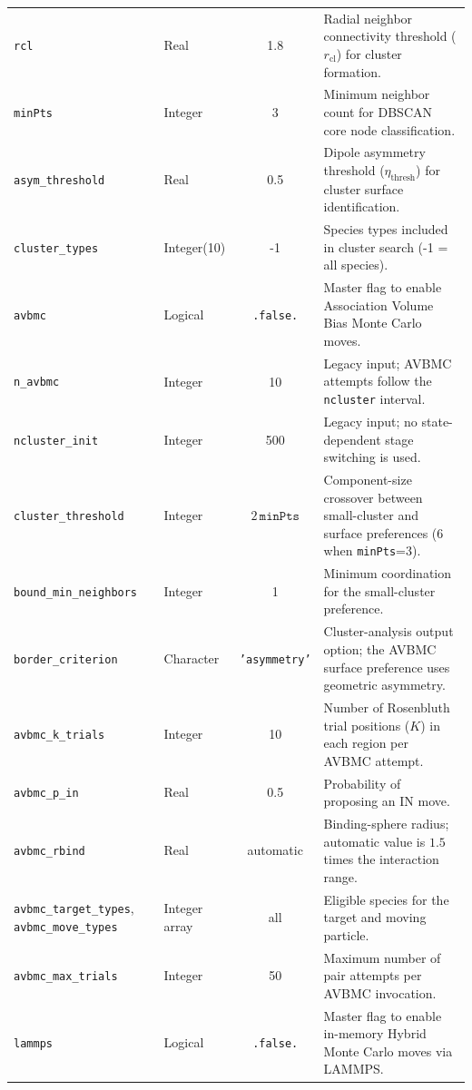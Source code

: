 \documentclass[final,5p,times,twocolumn]{elsarticle}
\begin{document}
\begin{table}[tbp]
\begin{tabularx}{\textwidth}{l l c X}
\texttt{rcl} & Real & 1.8 & Radial neighbor connectivity threshold ($r_{\text{cl}}$) for cluster formation. \\
\texttt{minPts} & Integer & 3 & Minimum neighbor count for DBSCAN core node classification. \\
\texttt{asym\_threshold}& Real & 0.5 & Dipole asymmetry threshold ($\eta_{\text{thresh}}$) for cluster surface identification. \\
\texttt{cluster\_types}& Integer(10) & -1 & Species types included in cluster search (-1 = all species). \\
\texttt{avbmc} & Logical & \texttt{.false.} & Master flag to enable Association Volume Bias Monte Carlo moves. \\
\texttt{n\_avbmc} & Integer & 10 & Legacy input; AVBMC attempts follow the \texttt{ncluster} interval. \\
\texttt{ncluster\_init} & Integer & 500 & Legacy input; no state-dependent stage switching is used. \\
\texttt{cluster\_threshold}& Integer & $2\,\texttt{minPts}$ & Component-size crossover between small-cluster and surface preferences (6 when \texttt{minPts}=3). \\
\texttt{bound\_min\_neighbors}& Integer & 1 & Minimum coordination for the small-cluster preference. \\
\texttt{border\_criterion}& Character & \texttt{'asymmetry'}& Cluster-analysis output option; the AVBMC surface preference uses geometric asymmetry. \\
\texttt{avbmc\_k\_trials}& Integer & 10 & Number of Rosenbluth trial positions ($K$) in each region per AVBMC attempt. \\
\texttt{avbmc\_p\_in}& Real & 0.5 & Probability of proposing an IN move. \\
\texttt{avbmc\_rbind}& Real & automatic & Binding-sphere radius; automatic value is $1.5$ times the interaction range. \\
\texttt{avbmc\_target\_types}, \texttt{avbmc\_move\_types}& Integer array & all & Eligible species for the target and moving particle. \\
\texttt{avbmc\_max\_trials}& Integer & 50 & Maximum number of pair attempts per AVBMC invocation. \\
\texttt{lammps} & Logical & \texttt{.false.} & Master flag to enable in-memory Hybrid Monte Carlo moves via LAMMPS. \\
\bottomrule
\end{tabularx}
\end{table}
\end{document}
